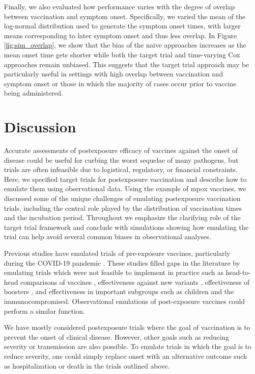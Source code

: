 \documentclass[11pt]{article}
\begin{document}
Finally, we also evaluated how performance varies with the degree of overlap between vaccination and symptom onset. Specifically, we varied the mean of the log-normal distribution used to generate the symptom onset times, with larger means corresponding to later symptom onset and thus less overlap. In Figure \ref{fig:sim_overlap}, we show that the bias of the naive approaches increases as the mean onset time gets shorter while both the target trial and time-varying Cox approaches remain unbiased. This suggests that the target trial approach may be particularly useful in settings with high overlap between vaccination and symptom onset or those in which the majority of cases occur prior to vaccine being administered.

\section{Discussion} \label{sec:discussion}
Accurate assessments of postexposure efficacy of vaccines against the onset of disease could be useful for curbing the worst sequelae of many pathogens, but trials are often infeasible due to logistical, regulatory, or financial constraints. Here, we specified target trials for postexposure vaccination and describe how to emulate them using observational data. Using the example of mpox vaccines, we discussed some of the unique challenges of emulating postexposure vaccination trials, including the central role played by the distribution of vaccination times and the incubation period. Throughout we emphasize the clarifying role of the target trial framework and conclude with simulations showing how emulating the trial can help avoid several common biases in observational analyses. 

Previous studies have emulated trials of pre-exposure vaccines, particularly during the COVID-19 pandemic \cite{dagan_bnt162b2_2021,dickerman_comparative_2022,cohen-stavi_bnt162b2_2022,barda_effectiveness_2021}. These studies filled gaps in the literature by emulating trials which were not feasible to implement in practice such as head-to-head comparisons of vaccines \cite{dickerman_comparative_2022}, effectiveness against new variants \cite{cohen-stavi_bnt162b2_2022}, effectiveness of boosters \cite{barda_effectiveness_2021,magen_fourth_2022}, and effectiveness in important subgroups such as children \cite{cohen-stavi_bnt162b2_2022} and the immunocompromised. Observational emulations of post-exposure vaccines could perform a similar function.

We have mostly considered postexposure trials where the goal of vaccination is to prevent the onset of clinical disease. However, other goals such as reducing severity or transmission are also possible. To emulate trials in which the goal is to reduce severity, one could simply replace onset with an alternative outcome such as hospitalization or death in the trials outlined above. 
\end{document}
